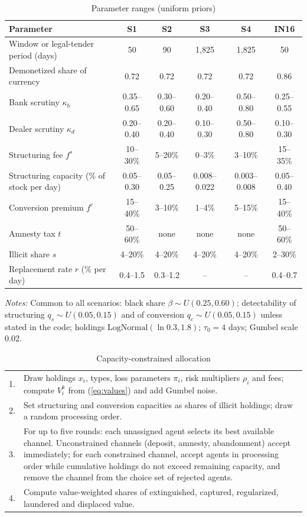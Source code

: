 \documentclass[11pt]{article}
\theoremstyle{definition}
\theoremstyle{remark}
\begin{document}
\begin{table}[!htbp]\centering\footnotesize
\caption{Parameter ranges (uniform priors)}\label{tab:params}
\begin{tabular}{@{}lccccc@{}}
\toprule
Parameter & S1 & S2 & S3 & S4 & IN16\\
\midrule
Window or legal-tender period (days) & 50 & 90 & 1,825 & 1,825 & 50\\
Demonetized share of currency & 0.72 & 0.72 & 0.72 & 0.72 & 0.86\\
Bank scrutiny $\kappa_b$ & 0.35--0.65 & 0.30--0.60 & 0.20--0.40 & 0.50--0.80 & 0.25--0.55\\
Dealer scrutiny $\kappa_d$ & 0.20--0.40 & 0.20--0.40 & 0.10--0.30 & 0.50--0.80 & 0.10--0.30\\
Structuring fee $f^{s}$ & 10--30\% & 5--20\% & 0--3\% & 3--10\% & 15--35\%\\
Structuring capacity (\% of stock per day) & 0.05--0.30 & 0.05--0.25 & 0.008--0.022 & 0.003--0.008 & 0.05--0.40\\
Conversion premium $f^{c}$ & 15--40\% & 3--10\% & 1--4\% & 5--15\% & 15--40\%\\
Amnesty tax $t$ & 50--60\% & none & none & none & 50--60\%\\
Illicit share $s$ & 4--20\% & 4--20\% & 4--20\% & 4--20\% & 2--30\%\\
Replacement rate $r$ (\% per day) & 0.4--1.5 & 0.3--1.2 & -- & -- & 0.4--0.7\\
\bottomrule
\end{tabular}
\par\smallskip\scriptsize\textit{Notes:} Common to all scenarios: black share $\beta\sim U(0.25,0.60)$; detectability of
structuring $q_s\sim U(0.05,0.15)$ and of conversion $q_c\sim U(0.05,0.15)$ unless stated in the code; holdings
$\mathrm{LogNormal}(\ln0.3,1.8)$; $\tau_0=4$ days; Gumbel scale 0.02.
\end{table}

\begin{table}[!htbp]\centering\small
\caption{Capacity-constrained allocation}\label{alg:alloc}
\begin{tabularx}{\textwidth}{@{}rY@{}}
. & Draw holdings $x_i$, types, loss parameters $\pi_i$, risk multipliers $\rho_i$ and fees; compute $V_i^k$ from
(\ref{eq:values}) and add Gumbel noise.\\
2. & Set structuring and conversion capacities as shares of illicit holdings; draw a random processing order.\\
3. & For up to five rounds: each unassigned agent selects its best available channel. Unconstrained channels (deposit,
amnesty, abandonment) accept immediately; for each constrained channel, accept agents in processing order while cumulative
holdings do not exceed remaining capacity, and remove the channel from the choice set of rejected agents.\\
4. & Compute value-weighted shares of extinguished, captured, regularized, laundered and displaced value.\\
\bottomrule
\end{tabularx}
\end{table}
\end{document}
